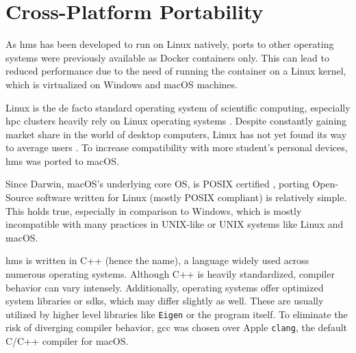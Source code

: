 \section{Cross-Platform Portability}\label{sec:porting-background}

As \gls{hms} has been developed to run on Linux natively, ports to other operating systems were previously available as Docker containers only.
This can lead to reduced performance due to the need of running the container on a Linux kernel, which is virtualized on Windows and macOS machines.

Linux is the de facto standard operating system of scientific computing, especially \gls{hpc} clusters heavily rely on Linux operating systems \autocite{linux2017}.
Despite constantly gaining market share in the world of desktop computers, Linux has not yet found its way to average users \autocite{statcounter2023}. To increase compatibility with more student's personal devices, \gls{hms} was ported to macOS.

Since Darwin, macOS's underlying core OS, is POSIX certified \autocite{lucy2007,opengroup2024}, porting Open-Source software written for Linux (mostly POSIX compliant) is relatively simple.
This holds true, especially in comparison to Windows, which is mostly incompatible with many practices in UNIX-like or UNIX systems like Linux and macOS.

\gls{hms} is written in C++ (hence the name), a language widely used across numerous operating systems.
Although C++ is heavily standardized, compiler behavior can vary intensely. Additionally, operating systems offer optimized system libraries or \glspl{sdk}, which may differ slightly as well. These are usually utilized by higher level libraries like \texttt{Eigen} or the program itself.
To eliminate the risk of diverging compiler behavior, \gls{gcc} was chosen over Apple \texttt{clang}, the default C/C++ compiler for macOS.

